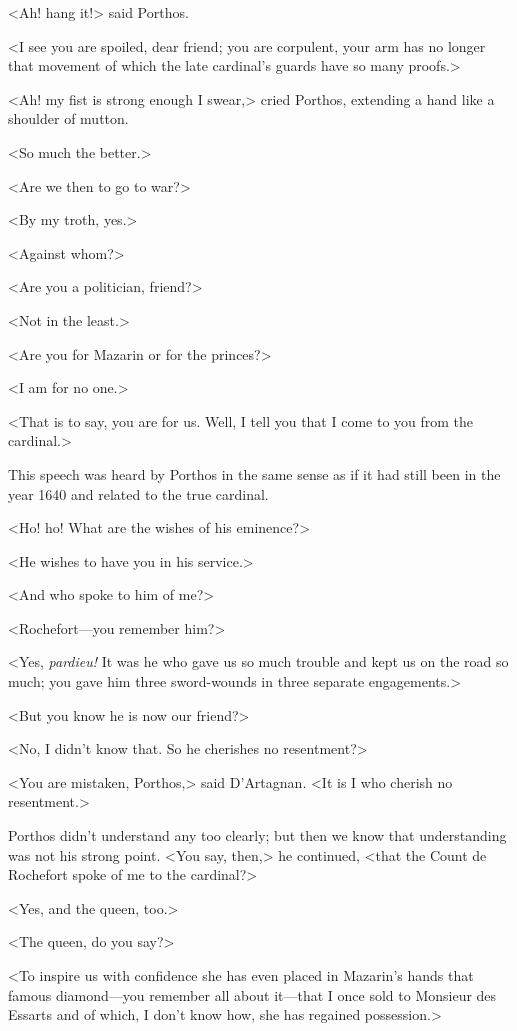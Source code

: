 <Ah! hang it!> said Porthos.

<I see you are spoiled, dear friend; you are corpulent, your arm has no longer that movement of which the late cardinal's guards have so many proofs.>

<Ah! my fist is strong enough I swear,> cried Porthos, extending a hand like a shoulder of mutton.

<So much the better.>

<Are we then to go to war?>

<By my troth, yes.>

<Against whom?>

<Are you a politician, friend?>

<Not in the least.>

<Are you for Mazarin or for the princes?>

<I am for no one.>

<That is to say, you are for us. Well, I tell you that I come to you from the cardinal.>

This speech was heard by Porthos in the same sense as if it had still been in the year 1640 and related to the true cardinal.

<Ho! ho! What are the wishes of his eminence?>

<He wishes to have you in his service.>

<And who spoke to him of me?>

<Rochefort—you remember him?>

<Yes, \textit{pardieu!} It was he who gave us so much trouble and kept us on the road so much; you gave him three sword-wounds in three separate engagements.>

<But you know he is now our friend?>

<No, I didn't know that. So he cherishes no resentment?>

<You are mistaken, Porthos,> said D'Artagnan. <It is I who cherish no resentment.>

Porthos didn't understand any too clearly; but then we know that understanding was not his strong point. <You say, then,> he continued, <that the Count de Rochefort spoke of me to the cardinal?>

<Yes, and the queen, too.>

<The queen, do you say?>

<To inspire us with confidence she has even placed in Mazarin's hands that famous diamond—you remember all about it—that I once sold to Monsieur des Essarts and of which, I don't know how, she has regained possession.>

